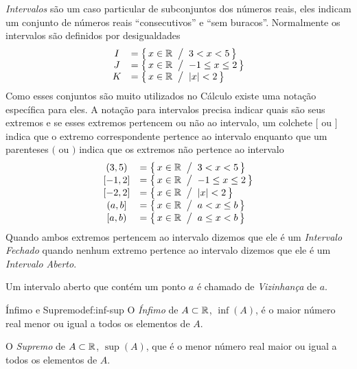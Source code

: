 \emph{Intervalos}
são um caso particular de subconjuntos dos números reais,
eles indicam um conjunto de números reais ``consecutivos'' e ``sem buracos''.
Normalmente os intervalos são definidos por desigualdades
\[
\begin{array}{cl}
  I & = \left\{\, x\in\R \st 3 < x < 5        \,\right\} \\
  J & = \left\{\, x\in\R \st -1 \leq x \leq 2 \,\right\} \\
  K & = \left\{\, x\in\R \st \abs{x} < 2      \,\right\}
\end{array}
\]
Como esses conjuntos são muito utilizados no Cálculo existe uma notação
específica para eles. A notação para intervalos precisa indicar quais
são seus extremos e se esses extremos pertencem ou não ao intervalo,
um colchete $[$ ou $]$ indica que o extremo correspondente pertence
ao intervalo enquanto que um parenteses $($ ou $)$ indica que os extremos
não pertence ao intervalo
\[
\begin{array}{cl}
  (3, 5)  & = \left\{\, x\in\R \st 3 < x < 5        \,\right\} \\[1pt]
  [-1, 2] & = \left\{\, x\in\R \st -1 \leq x \leq 2 \,\right\} \\[1pt]
  [-2, 2] & = \left\{\, x\in\R \st \abs{x} < 2      \,\right\} \\[1pt]
  (a, b]  & = \left\{\, x\in\R \st a <    x \leq b  \,\right\} \\[1pt]
  [a, b)  & = \left\{\, x\in\R \st a \leq x <    b  \,\right\}
\end{array}
\]
Quando ambos extremos pertencem ao intervalo dizemos que ele é um
\emph{Intervalo Fechado} quando
nenhum extremo pertence ao intervalo dizemos que ele é um
\emph{Intervalo Aberto}.

Um intervalo aberto que contém um ponto $a$ é chamado de
\emph{Vizinhança} de $a$.


\begin{definicao}{Ínfimo e Supremo}{def:inf-sup}
  O \emph{Ínfimo} de $A\subset\mathbb{R}$, $\inf(A)$,
  é o maior número real menor ou igual a todos os elementos de $A$.

  O \emph{Supremo} de $A\subset\mathbb{R}$, $\sup(A)$,
  que é o menor número real maior ou igual a todos os elementos de $A$.
\end{definicao}

